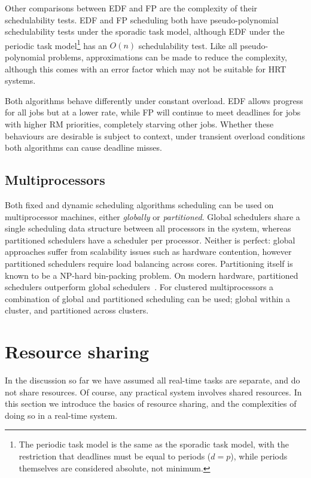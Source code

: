 Other comparisons between \gls{EDF} and \gls{FP} are the complexity of their schedulability tests.
\gls{EDF} and \gls{FP} scheduling both have pseudo-polynomial
schedulability tests under the sporadic task model, although \gls{EDF} under the periodic task
model\footnote{The periodic task model is the same as the sporadic task model, with the restriction
that deadlines must be equal to periods ($d = p$), while periods themselves are considered absolute,
not minimum.} has an $O(n)$ schedulability test.  Like all pseudo-polynomial problems,
approximations can be made to reduce the complexity, although this comes with an error factor which
may not be suitable for \gls{HRT} systems.  

Both algorithms behave differently under constant
overload. \gls{EDF} allows progress for all jobs but at a lower rate, while \gls{FP} will
continue to meet deadlines for jobs with higher \gls{RM} priorities, completely starving other
jobs. Whether these behaviours are desirable is subject to context, under
transient overload conditions both algorithms can cause deadline misses.


\subsection{Multiprocessors}

Both fixed and dynamic scheduling algorithms scheduling can be used on multiprocessor machines, either
\emph{globally} or \emph{partitioned}. Global schedulers share a single scheduling data structure
between all processors in the system, whereas partitioned schedulers have a scheduler per processor.
Neither is perfect: global approaches suffer from scalability issues such as hardware contention,
however partitioned schedulers require load balancing across cores.  Partitioning itself is known to
be a NP-hard bin-packing problem.  On modern hardware, partitioned schedulers outperform global
schedulers~\citep{Brandenburg:phd}.  For clustered multiprocessors a combination of global and
partitioned scheduling can be used; global within a cluster, and partitioned across clusters.

\section{Resource sharing}
\label{sec:resource-sharing-theory}

In the discussion so far we have assumed all real-time tasks are separate, and do not share resources.
Of course, any practical system involves shared resources. In this section we introduce the basics
of resource sharing, and the complexities of doing so in a real-time system.

